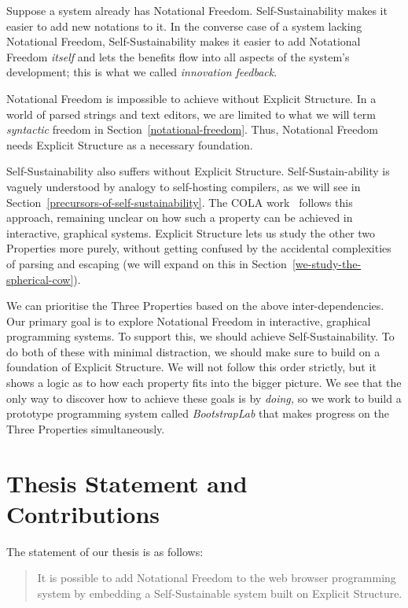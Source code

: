 \documentclass[ twoside,openright,titlepage,numbers=noenddot,headinclude,footinclude,cleardoublepage=empty,abstract=on,
                BCOR=5mm,paper=a4,fontsize=11pt
                ]{scrreprt}
\theoremstyle{definition}
\begin{document}
Suppose a system already has Notational Freedom. Self-Sustainability
makes it easier to add new notations to it. In the converse case of a
system lacking Notational Freedom, Self-Sustainability makes it easier
to add Notational Freedom \emph{itself} and lets the benefits flow into
all aspects of the system's development; this is what we called
\emph{innovation feedback}.

Notational Freedom is impossible to achieve without Explicit Structure.
In a world of parsed strings and text editors, we are limited to what we
will term \emph{syntactic} freedom in Section~\ref{notational-freedom}.
Thus, Notational Freedom needs Explicit Structure as a necessary
foundation.

Self-Sustainability also suffers without Explicit Structure.
Self-Sustain-ability is vaguely understood by analogy to self-hosting
compilers, as we will see in
Section~\ref{precursors-of-self-sustainability}. The \ac{COLA}
work~\parencite{COLAs} follows this approach, remaining unclear on how
such a property can be achieved in interactive, graphical systems.
Explicit Structure lets us study the other two Properties more purely,
without getting confused by the accidental complexities of parsing and
escaping (we will expand on this in
Section~\ref{we-study-the-spherical-cow}).

We can prioritise the Three Properties based on the above
inter-dependencies. Our primary goal is to explore Notational Freedom in
interactive, graphical programming systems. To support this, we should
achieve Self-Sustainability. To do both of these with minimal
distraction, we should make sure to build on a foundation of Explicit
Structure. We will not follow this order strictly, but it shows a logic
as to how each property fits into the bigger picture. We see that the
only way to discover how to achieve these goals is by \emph{doing,} so
we work to build a prototype programming system called
\emph{BootstrapLab} that makes progress on the Three Properties
simultaneously.

\hypertarget{thesis-statement-and-contributions}{\section{Thesis Statement and
Contributions}\label{thesis-statement-and-contributions}}

The statement of our thesis is as follows:

\begin{quote}
It is possible to add Notational Freedom to the web browser programming
system by embedding a Self-Sustainable system built on Explicit
Structure.
\end{quote}
\end{document}
